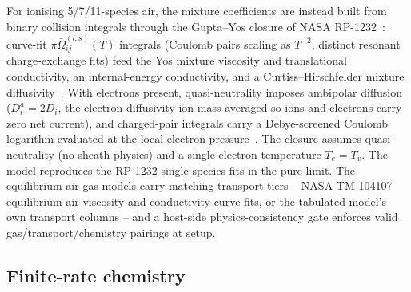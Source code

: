 \documentclass[journal,biblatex]{new-aiaa}
\begin{document}
For ionising 5/7/11-species air, the mixture coefficients are instead built from binary collision integrals through the Gupta--Yos closure of NASA RP-1232~\cite{gupta_review_1990}: curve-fit $\pi\bar\Omega^{(l,s)}_{ij}(T)$ integrals (Coulomb pairs scaling as $T^{-2}$, distinct resonant charge-exchange fits) feed the Yos mixture viscosity and translational conductivity, an internal-energy conductivity, and a Curtiss--Hirschfelder mixture diffusivity~\cite{giovangigli_multicomponent_1999}. With electrons present, quasi-neutrality imposes ambipolar diffusion ($D_i^a=2D_i$, the electron diffusivity ion-mass-averaged so ions and electrons carry zero net current), and charged-pair integrals carry a Debye-screened Coulomb logarithm evaluated at the local electron pressure~\cite{gnoffo_conservation_1989}. The closure assumes quasi-neutrality (no sheath physics) and a single electron temperature $T_e=T_v$. The model reproduces the RP-1232 single-species fits in the pure limit. The equilibrium-air gas models carry matching transport tiers -- NASA TM-104107 equilibrium-air viscosity and conductivity curve fits, or the tabulated model's own transport columns -- and a host-side physics-consistency gate enforces valid gas/transport/chemistry pairings at setup.

\subsection{Finite-rate chemistry}
\label{sec:chem}
\end{document}
